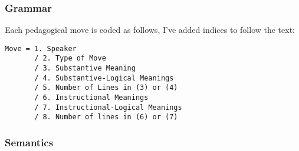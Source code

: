 \documentclass[10pt, letterpaper]{article}
\begin{document}
\subsubsection*{Grammar}
\label{sec:org95e3007}
Each pedagogical move is coded as follows, I've added indices to follow the text: \\
\begin{verbatim}
Move = 1. Speaker 
       / 2. Type of Move 
       / 3. Substantive Meaning
       / 4. Substantive-Logical Meanings 
       / 5. Number of Lines in (3) or (4) 
       / 6. Instructional Meanings 
       / 7. Instructional-Logical Meanings 
       / 8. Number of lines in (6) or (7) 
\end{verbatim}

\subsubsection*{Semantics}
\label{sec:org5f2d277}
\end{document}
